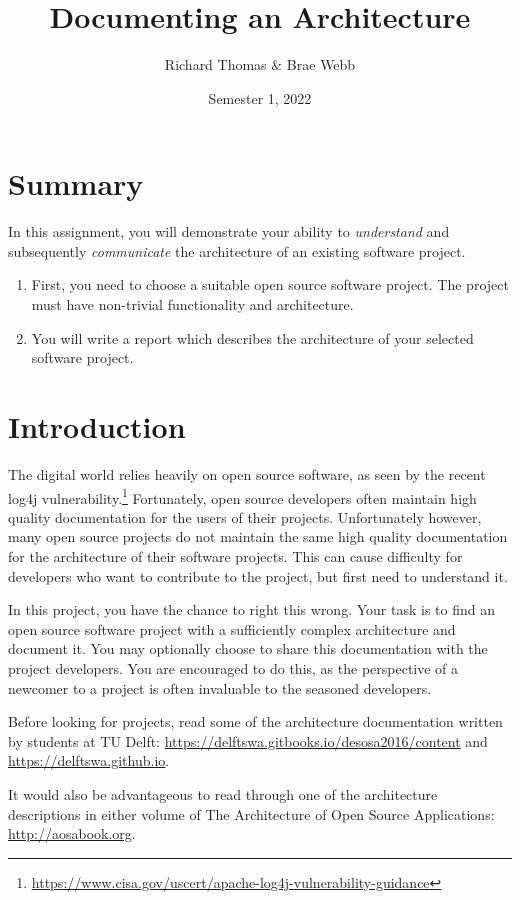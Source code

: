 \documentclass{csse4400}
\title{Documenting an Architecture}
\author{Richard Thomas \& Brae Webb}
\date{Semester 1, 2022}
\begin{document}
\maketitle

\section*{Summary}
In this assignment, you will demonstrate your ability to \textsl{understand}
and subsequently \textsl{communicate} the architecture of an existing software project.
\begin{enumerate}
    \item First, you need to choose a suitable open source software project.
             The project must have non-trivial functionality and architecture.
    \item You will write a report which describes the architecture of your selected software project.
\end{enumerate}


\section{Introduction}
The digital world relies heavily on open source software, as seen by the recent log4j vulnerability.\footnote{\url{https://www.cisa.gov/uscert/apache-log4j-vulnerability-guidance}}
Fortunately, open source developers often maintain high quality documentation for the users of their projects.
Unfortunately however, many open source projects do not maintain the same high quality documentation for the architecture of their software projects.
This can cause difficulty for developers who want to contribute to the project, but first need to understand it.

In this project, you have the chance to right this wrong.
Your task is to find an open source software project with a sufficiently complex architecture and document it.
You may optionally choose to share this documentation with the project developers.
You are encouraged to do this, as the perspective of a newcomer to a project is often invaluable to the seasoned developers.

Before looking for projects, read some of the architecture documentation written by students at TU Delft:
\url{https://delftswa.gitbooks.io/desosa2016/content} and \url{https://delftswa.github.io}.

It would also be advantageous to read through one of the architecture descriptions in either volume of
The Architecture of Open Source Applications: \url{http://aosabook.org}.
\end{document}
